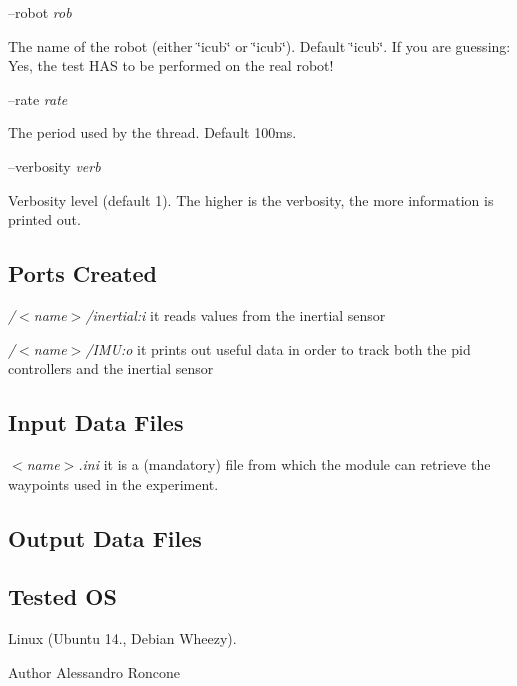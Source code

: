 --robot {\itshape rob} 
\begin{DoxyItemize}
\item The name of the robot (either \char`\"{}icub\char`\"{} or \char`\"{}icub\char`\"{}). Default \char`\"{}icub\char`\"{}. If you are guessing\+: Yes, the test H\+AS to be performed on the real robot!
\end{DoxyItemize}

--rate {\itshape rate} 
\begin{DoxyItemize}
\item The period used by the thread. Default 100ms.
\end{DoxyItemize}

--verbosity {\itshape verb} 
\begin{DoxyItemize}
\item Verbosity level (default 1). The higher is the verbosity, the more information is printed out.
\end{DoxyItemize}\hypertarget{group__icub__iCubWriter_portsc_sec}{}\subsection{Ports Created}\label{group__icub__iCubWriter_portsc_sec}

\begin{DoxyItemize}
\item {\itshape  /$<$name$>$/inertial\+:i } it reads values from the inertial sensor
\item {\itshape  /$<$name$>$/\+I\+MU\+:o } it prints out useful data in order to track both the pid controllers and the inertial sensor
\end{DoxyItemize}\hypertarget{group__icub__iCubBreather_in_files_sec}{}\subsection{Input Data Files}\label{group__icub__iCubBreather_in_files_sec}

\begin{DoxyItemize}
\item {\itshape  $<$name$>$.ini } it is a (mandatory) file from which the module can retrieve the waypoints used in the experiment.
\end{DoxyItemize}\hypertarget{group__icub__iCubBreather_out_data_sec}{}\subsection{Output Data Files}\label{group__icub__iCubBreather_out_data_sec}
\hypertarget{group__icub__iCubWriter_tested_os_sec}{}\subsection{Tested OS}\label{group__icub__iCubWriter_tested_os_sec}
Linux (Ubuntu 14., Debian Wheezy).

\begin{DoxyAuthor}{Author}
Alessandro Roncone 
\end{DoxyAuthor}
